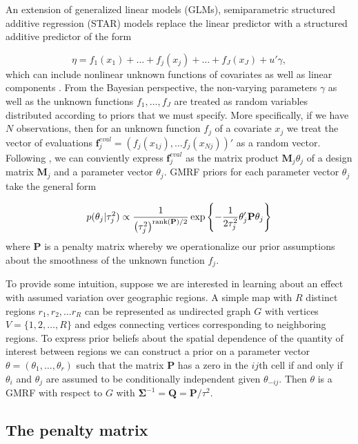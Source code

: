 An extension of generalized linear models (GLMs), semiparametric structured additive regression (STAR) models replace the linear predictor with a structured additive predictor of the form

{\singlespacing
$$\eta = f_1(x_1) + \ldots + f_j(x_j) + \ldots + f_J(x_J) + u'\gamma, $$
}
%
\noindent which can include nonlinear unknown functions of covariates as well as linear components . From the Bayesian perspective, the non-varying parameters $\gamma$ as well as the unknown functions $f_1, \dots, f_J$ are treated as random variables distributed according to priors that we must specify. More specifically, if we have $N$ observations, then for an unknown function $f_j$ of a covariate $x_j$ we treat the vector of evaluations $\mathbf{f}_j^{eval} = \left(f_j(x_{1j}), \dots f_j(x_{Nj})\right)' $ as a random vector. Following , we can conviently express $\mathbf{f}_j^{eval}$ as the matrix product $\mathbf{M}_j \theta_j$ of a design matrix $\mathbf{M}_j$ and a parameter vector $\theta_j$. GMRF priors for each parameter vector $\theta_j$ take the general form

{\singlespacing
$$
p(\theta_j | \tau^2_j) 
\propto 
\frac{1}{\left(\tau^2_j\right)^{{\rm rank}(\mathbf{P})/2} }
\exp{\left\{-\frac{1}{2\tau^2_j} \theta_j' \mathbf{P} \theta_j\right\}}
$$ 
}
% 
\noindent where $\mathbf{P}$ is a penalty matrix whereby we operationalize our prior assumptions about the smoothness of the unknown function $f_j$. 

To provide some intuition, suppose we are interested in learning about an effect with assumed variation over geographic regions.  A simple map with $R$ distinct regions $r_1, r_2, \dots r_R$ can be represented as undirected graph $G$ with vertices $V = \{1, 2, \dots, R\}$ and edges connecting vertices corresponding to neighboring regions. To express prior beliefs about the spatial dependence of the quantity of interest between regions we can construct a prior on a parameter vector $\theta = (\theta_1, \dots, \theta_r)$ such that the matrix $\mathbf{P}$ has a zero in the $ij$th cell if and only if $\theta_i$ and $\theta_j$ are assumed to be conditionally independent given $\theta_{-ij}$. Then $\theta$ is a GMRF with respect to $G$ with $\boldsymbol{\Sigma}^{-1} = \mathbf{Q} = \mathbf{P}/\tau^2$. 

\subsection{The penalty matrix} 


